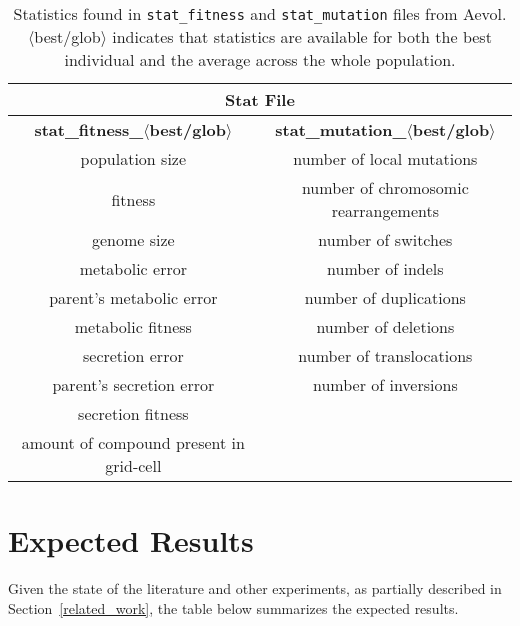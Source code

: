 \begin{table}[H]
	\centering
	\begin{tabular}{ |c|c| }
		\hline
		\multicolumn{2}{|c|}{\textbf{Stat File}} \\
		\hline
		\textbf{stat\_fitness\_$\langle$best/glob$\rangle$} &
		\textbf{stat\_mutation\_$\langle$best/glob$\rangle$} \\
		\hline \hline
		population size & number of local mutations \\
		fitness & number of chromosomic rearrangements \\
		genome size & number of switches \\
		metabolic error & number of indels \\
		parent's metabolic error & number of duplications \\
		metabolic fitness & number of deletions \\
		secretion error & number of translocations \\
		parent's secretion error & number of inversions \\
		secretion fitness & \\ 
		amount of compound present in grid-cell & \\
		\hline
	\end{tabular}	
	\caption[Aevol's stats: fitness and mutation]{Statistics found in \texttt{stat\_fitness} and \texttt{stat\_mutation} files from Aevol. $\langle$best/glob$\rangle$ indicates that statistics are available for both the best individual and the average across the whole population.}
	\label{table:aevol_stats_fitness_and_mutation}
\end{table}
 
\section{Expected Results}\label{sec:expected_results}
Given the state of the literature and other experiments, as partially described in Section~\ref{related_work}, the table below summarizes the expected results. 

